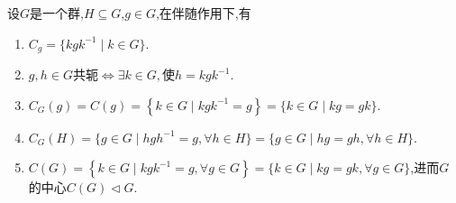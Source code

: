 \documentclass[../../main.tex]{subfiles}%
\begin{document}
\begin{theorem}\label{theorem:共轭类,中心化子,中心的集合形式}
设$G$是一个群,$H\subseteq G$,$g\in G$,在伴随作用下,有
\begin{enumerate}[(1)]
\item\label{theorem:共轭类,中心化子,中心的集合形式-1} $C_g = \{kgk^{-1} \mid k \in G\}$.

\item\label{theorem:共轭类,中心化子,中心的集合形式-2} $g,h\in G\text{共轭}\Longleftrightarrow \exists k\in G,\text{使}h=kgk^{-1}$.

\item\label{theorem:共轭类,中心化子,中心的集合形式-3} $C_G(g) = C(g) = \left\{ k\in G\mid kgk^{-1}=g \right\} = \{k \in G \mid kg = gk\}$.

\item\label{theorem:共轭类,中心化子,中心的集合形式-5} $C_G(H) = \{g\in G\mid hgh^{-1}=g,\forall h\in H\} = \{g\in G\mid hg = gh,\forall h\in H\}$.

\item\label{theorem:共轭类,中心化子,中心的集合形式-4} $C(G) =\left\{ k\in G\mid kgk^{-1}=g,\forall g\in G \right\}  = \{k \in G \mid kg = gk, \forall g \in G\}$,进而$G$的中心$C(G)\lhd G$.
\end{enumerate}
\end{theorem}
\end{document}
